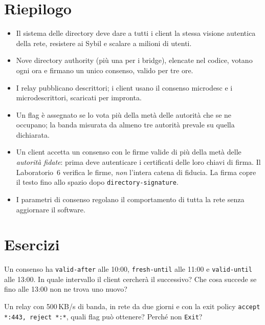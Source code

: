 \section*{Riepilogo}
\begin{itemize}
  \item Il sistema delle directory deve dare a tutti i client la stessa visione autentica della rete, resistere ai Sybil e scalare a milioni di utenti.
  \item Nove directory authority (più una per i bridge), elencate nel codice, votano ogni ora e firmano un unico consenso, valido per tre ore.
  \item I relay pubblicano descrittori; i client usano il consenso microdesc e i microdescrittori, scaricati per impronta.
  \item Un flag è assegnato se lo vota più della metà delle autorità che se ne occupano; la banda misurata da almeno tre autorità prevale su quella dichiarata.
  \item Un client accetta un consenso con le firme valide di più della metà delle \emph{autorità fidate}: prima deve autenticare i certificati delle loro chiavi di firma. Il Laboratorio~6 verifica le firme, \emph{non} l'intera catena di fiducia. La firma copre il testo fino allo spazio dopo \texttt{directory-signature}.
  \item I parametri di consenso regolano il comportamento di tutta la rete senza aggiornare il software.
\end{itemize}

\section*{Esercizi}

\begin{esercizio}[1]\label{es:12-validita}
Un consenso ha \texttt{valid-after} alle 10:00, \texttt{fresh-until} alle 11:00 e \texttt{valid-until} alle 13:00. In quale intervallo il client cercherà il successivo? Che cosa succede se fino alle 13:00 non ne trova uno nuovo?
\end{esercizio}

\begin{esercizio}[1]\label{es:12-flag}
Un relay con 500\,KB/s di banda, in rete da due giorni e con la exit policy \texttt{accept *:443, reject *:*}, quali flag può ottenere? Perché non \texttt{Exit}?
\end{esercizio}

